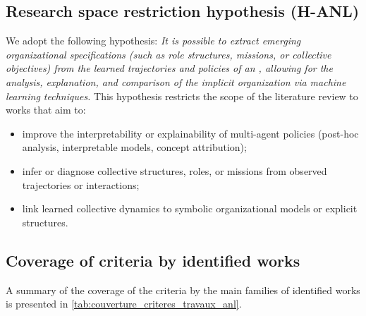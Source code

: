\subsection*{Research space restriction hypothesis (\textbf{H-ANL})}

We adopt the following hypothesis: \textit{It is possible to extract emerging organizational specifications (such as role structures, missions, or collective objectives) from the learned trajectories and policies of an , allowing for the analysis, explanation, and comparison of the implicit organization via machine learning techniques. }
This hypothesis restricts the scope of the literature review to works that aim to:
\begin{itemize}
  \item improve the interpretability or explainability of multi-agent policies (post-hoc analysis, interpretable models, concept attribution);
  \item infer or diagnose collective structures, roles, or missions from observed trajectories or interactions;
  \item link learned collective dynamics to symbolic organizational models or explicit structures.
\end{itemize}

\subsection*{Coverage of criteria by identified works}

A summary of the coverage of the criteria by the main families of identified works is presented in \autoref{tab:couverture_criteres_travaux_anl}.

